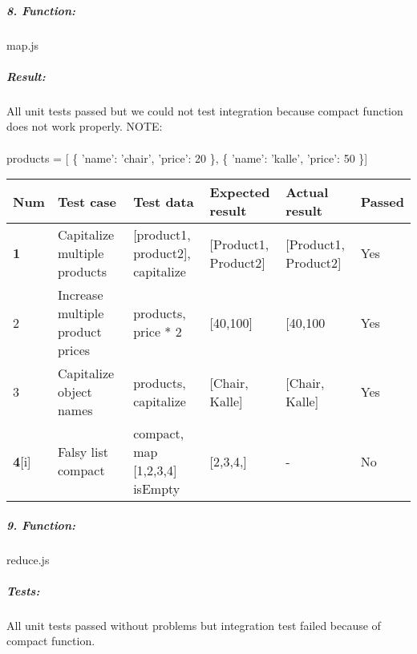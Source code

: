 \documentclass[a4paper, 12pt]{article}
\begin{document}
		\hypertarget{header-n288}{%
		\subparagraph{8. Function:}\label{header-n288}}
		
		map.js
		
		\hypertarget{header-n303}{%
		\subparagraph{Result:}\label{header-n303}}
		
		All unit tests passed but we could not test integration because compact
		function does not work properly.
    NOTE: 
    \\
    \\
    products = 
       [  \{
        'name': 'chair',
        'price': 20
      \},
      \{
        'name': 'kalle',
        'price': 50
      \}]
        \begin{table}[h!]
        	\begin{tabular}{|l|p{3cm}|p{2cm}|p{2cm}|p{2.5cm}|l|}
        		\hline
        		Num & Test case        					& Test data 									& Expected result 					& Actual result 		& Passed \\ \hline
        		\textbf{1}   & Capitalize multiple products 	& {[}product1, product2{]}, capitalize     		& {[}Product1, Product2{]}          &   {[}Product1, Product2{]}              		& Yes     \\ \hline
        		2   & Increase multiple product prices 	& products, price * 2   		& [40,100]       &   [40,100\               		& Yes     \\ \hline
        		3   & Capitalize object names 	& products, capitalize     		& [Chair, Kalle]       &  [Chair, Kalle]              		& Yes     \\ \hline
        		\textbf{4}[i]   & Falsy list compact 	& compact, map [1,2,3,4] isEmpty     		& [2,3,4,]          &   -              		& No     \\ \hline
        	\end{tabular}
        \end{table}
		
		\newpage
		
		\hypertarget{header-n423}{%
		\subparagraph{9. Function:}\label{header-n423}}
		
		reduce.js
		
		\hypertarget{header-n425}{%
		\subparagraph{Tests:}\label{header-n425}}
		

		
	
		
		All unit tests passed without problems but integration test failed
		because of compact function.
\end{document}
